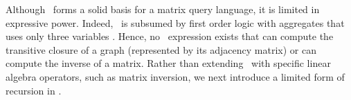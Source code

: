 
\noindent
Although \lang\ forms a solid basis for a matrix query language, it is limited in expressive power. Indeed, \lang\ is subsumed by first order logic with aggregates that uses only three variables \cite{matlang-journal}. 
Hence, no \lang\ expression exists that can compute the transitive closure of a graph (represented by its adjacency matrix) or can compute the inverse of a matrix. Rather than extending \lang\ with specific linear algebra operators, such as matrix inversion, we  
next introduce a limited form of recursion in \lang.
